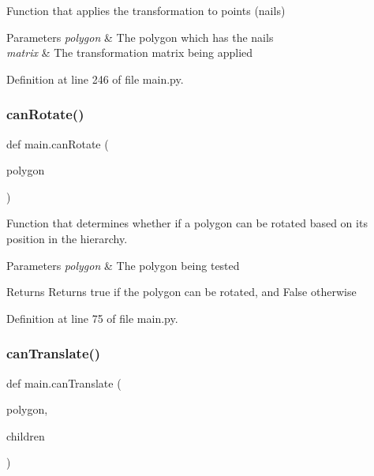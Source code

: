 Function that applies the transformation to points (nails) 


\begin{DoxyParams}{Parameters}
{\em polygon} & The polygon which has the nails \\
\hline
{\em matrix} & The transformation matrix being applied \\
\hline
\end{DoxyParams}


Definition at line 246 of file main.\+py.

\mbox{\label{namespacemain_ae1d466859928a06baa89a7b9279f4fa1}} 
\subsubsection{\texorpdfstring{can\+Rotate()}{canRotate()}}
{\footnotesize\ttfamily def main.\+can\+Rotate (\begin{DoxyParamCaption}\item[{}]{polygon }\end{DoxyParamCaption})}



Function that determines whether if a polygon can be rotated based on its position in the hierarchy. 


\begin{DoxyParams}{Parameters}
{\em polygon} & The polygon being tested \\
\hline
\end{DoxyParams}
\begin{DoxyReturn}{Returns}
Returns true if the polygon can be rotated, and False otherwise 
\end{DoxyReturn}


Definition at line 75 of file main.\+py.

\mbox{\label{namespacemain_a88fcd4aa7193703d53a8095e78a40fe9}} 
\subsubsection{\texorpdfstring{can\+Translate()}{canTranslate()}}
{\footnotesize\ttfamily def main.\+can\+Translate (\begin{DoxyParamCaption}\item[{}]{polygon,  }\item[{}]{children }\end{DoxyParamCaption})}




